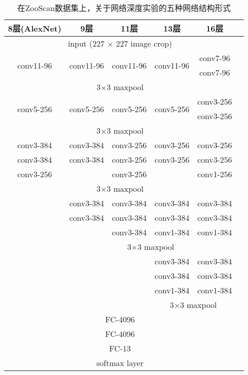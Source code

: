 \begin{table}[H]
\centering
\caption{在ZooScan数据集上，关于网络深度实验的五种网络结构形式}
\label{tab:config}
\begin{tabular}{|c|c|c|c|c|c|}
\hline 8层(AlexNet) & 9层 & 11层 & 13层 & 16层 \\ 
\hline \multicolumn{5}{|c|}{input (227 $\times$ 227 image crop)} \\
\hline \multirow{2}{*}{conv11-96} & \multirow{2}{*}{conv11-96} & \multirow{2}{*}{conv11-96} & \multirow{2}{*}{conv11-96} & conv7-96 \\
	& & & & conv7-96 \\
\hline \multicolumn{5}{|c|}{3$\times$3 maxpool} \\
\hline \multirow{2}{*}{conv5-256} & \multirow{2}{*}{conv5-256} & \multirow{2}{*}{conv5-256} & \multirow{2}{*}{conv5-256} & conv3-256 \\
	& & & & conv3-256 \\
\hline \multicolumn{5}{|c|}{3$\times$3 maxpool} \\
\hline conv3-384 &  conv3-384 & conv3-256 & conv3-256 & conv3-256 \\

	conv3-384 & conv3-384 & conv3-256 & conv3-256 & conv3-256  \\

	conv3-256 & & conv3-256 & & conv1-256 \\
	\cline{1-5} \multicolumn{5}{|c|}{3$\times$3 maxpool} \\
	\cline{1-5} &  conv3-384 & conv3-384 & conv3-384 & conv3-384 \\
	& conv3-384 & conv3-384 & conv3-384 & conv3-384  \\
	&  &  conv3-384 & conv1-384 & conv1-384 \\
	\cline{2-5} &  \multicolumn{4}{c|}{3$\times$3 maxpool} \\
	\cline{1-5} & & & conv3-384 & conv3-384 \\
	 & & & conv3-384 & conv3-384 \\
	& & & conv1-384 & conv1-384 \\
	\cline{4-5} & & & \multicolumn{2}{|c|}{3$\times$3 maxpool}\\

\hline \multicolumn{5}{|c|}{FC-4096}\\
\hline \multicolumn{5}{|c|}{FC-4096}\\
\hline \multicolumn{5}{|c|}{FC-13}\\
\hline \multicolumn{5}{|c|}{softmax layer} \\
\hline  
\end{tabular}
\end{table}

